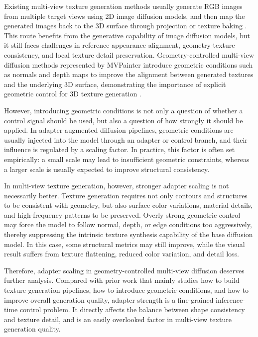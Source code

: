 \documentclass[times,twocolumn,final]{elsarticle}
\begin{document}
Existing multi-view texture generation methods usually generate RGB images from multiple target views using 2D image diffusion models, and then map the generated images back to the 3D surface through projection or texture baking \cite{chen2023text2tex,richardson2023texture,poole2023dreamfusion,chen2023fantasia3d}. This route benefits from the generative capability of image diffusion models, but it still faces challenges in reference appearance alignment, geometry-texture consistency, and local texture detail preservation. Geometry-controlled multi-view diffusion methods represented by MVPainter introduce geometric conditions such as normals and depth maps to improve the alignment between generated textures and the underlying 3D surface, demonstrating the importance of explicit geometric control for 3D texture generation \cite{shao2025mvpainter}.

However, introducing geometric conditions is not only a question of whether a control signal should be used, but also a question of how strongly it should be applied. In adapter-augmented diffusion pipelines, geometric conditions are usually injected into the model through an adapter or control branch, and their influence is regulated by a scaling factor. In practice, this factor is often set empirically: a small scale may lead to insufficient geometric constraints, whereas a larger scale is usually expected to improve structural consistency.

In multi-view texture generation, however, stronger adapter scaling is not necessarily better. Texture generation requires not only contours and structures to be consistent with geometry, but also surface color variations, material details, and high-frequency patterns to be preserved. Overly strong geometric control may force the model to follow normal, depth, or edge conditions too aggressively, thereby suppressing the intrinsic texture synthesis capability of the base diffusion model. In this case, some structural metrics may still improve, while the visual result suffers from texture flattening, reduced color variation, and detail loss.

Therefore, adapter scaling in geometry-controlled multi-view diffusion deserves further analysis. Compared with prior work that mainly studies how to build texture generation pipelines, how to introduce geometric conditions, and how to improve overall generation quality, adapter strength is a fine-grained inference-time control problem. It directly affects the balance between shape consistency and texture detail, and is an easily overlooked factor in multi-view texture generation quality.
\end{document}

